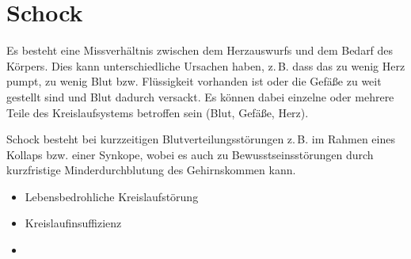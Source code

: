 \section{Schock}
\label{topic:schock}

{{\TxBeschreibung}}
{%
Es besteht eine
Missverhältnis zwischen dem Herzauswurfs und dem Bedarf des
Körpers. Dies kann unterschiedliche Ursachen haben, z.\,B.
dass das  zu wenig Herz pumpt, zu wenig Blut bzw.
Flüssigkeit vorhanden ist oder die Gefäße zu weit gestellt
sind und Blut dadurch versackt.
Es können dabei einzelne oder mehrere Teile des
Kreislaufsystems betroffen sein  (Blut, Gefäße, Herz). 

 Schock besteht bei kurzzeitigen
Blutverteilungsstörungen z.\,B. im Rahmen eines Kollaps
bzw. einer Synkope, wobei es auch zu Bewusstseinsstörungen
durch kurzfristige Minderdurchblutung des Gehirnskommen
kann.}
{%
\begin{itemize}
  \item Lebensbedrohliche Kreislaufstörung
  \item Kreislaufinsuffizienz 
  \item {}
\end{itemize}
}
{}
{}
{}









